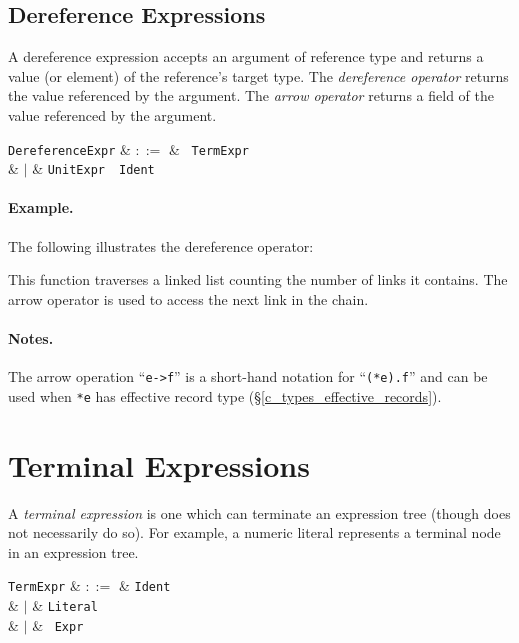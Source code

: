 
\subsection{Dereference Expressions}
\label{c_expr_dereference}

A dereference expression accepts an argument of reference type and returns a value (or element) of the reference's target type.  The {\em dereference operator} returns the value referenced by the argument.  The {\em arrow operator} returns a field of the value referenced by the argument.

\begin{syntax}
  \verb+DereferenceExpr+ & $::=$ & \token{*}\ \verb+TermExpr+\\
  & $|$ & \verb+UnitExpr+\ \token{->}\ \verb+Ident+\\
\end{syntax}

\paragraph{Example.} The following illustrates the dereference operator:



This function traverses a linked list counting the number of links it contains.  The arrow operator is used to access the next link in the chain.

\paragraph{Notes.} The arrow operation ``\lstinline{e->f}'' is a short-hand notation for ``\lstinline{(*e).f}'' and can be used when \lstinline{*e} has effective record type (\S\ref{c_types_effective_records}).



\section{Terminal Expressions}
\label{c_expr_term}

A {\em terminal expression} is one which can terminate an expression tree (though does not necessarily do so).  For example, a numeric literal represents a terminal node in an expression tree.

\begin{syntax}
  \verb+TermExpr+ & $::=$ & \verb+Ident+\\
  & $|$ & \verb+Literal+\\
  & $|$ & \token{(}\ \verb+Expr+\ \token{)}\\
\end{syntax}

